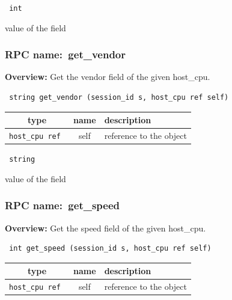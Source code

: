 \vspace{0.3cm}

{\tt 
int
}


value of the field
\vspace{0.3cm}
\vspace{0.3cm}
\vspace{0.3cm}
\subsubsection{RPC name:~get\_vendor}

{\bf Overview:} 
Get the vendor field of the given host\_cpu.

\begin{verbatim} string get_vendor (session_id s, host_cpu ref self)\end{verbatim}



 
\vspace{0.3cm}
\begin{tabular}{|c|c|p{7cm}|}
 \hline
{\bf type} & {\bf name} & {\bf description} \\ \hline
{\tt host\_cpu ref } & self & reference to the object \\ \hline 

\end{tabular}

\vspace{0.3cm}

{\tt 
string
}


value of the field
\vspace{0.3cm}
\vspace{0.3cm}
\vspace{0.3cm}
\subsubsection{RPC name:~get\_speed}

{\bf Overview:} 
Get the speed field of the given host\_cpu.

\begin{verbatim} int get_speed (session_id s, host_cpu ref self)\end{verbatim}



 
\vspace{0.3cm}
\begin{tabular}{|c|c|p{7cm}|}
 \hline
{\bf type} & {\bf name} & {\bf description} \\ \hline
{\tt host\_cpu ref } & self & reference to the object \\ \hline 

\end{tabular}

